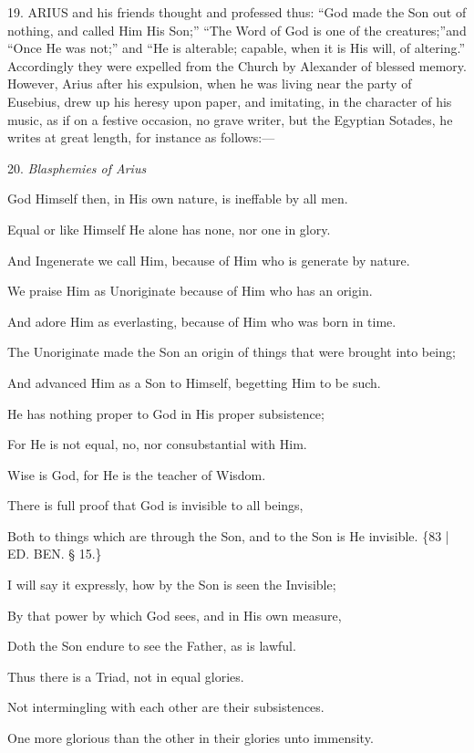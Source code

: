 
19. ARIUS
and his friends thought and professed thus: ``God made the Son out of
nothing, and called Him His Son;'' ``The Word of God is one of the
creatures;''\emph{}and ``Once He was not;'' and ``He is alterable;
capable, when it is His will, of altering.'' Accordingly they were
expelled from the Church by Alexander of blessed memory. However,
Arius after his expulsion, when he was living near the party of
Eusebius, drew up his heresy upon paper, and imitating, in the
character of his music, as if on a festive occasion, no grave writer,
but the Egyptian Sotades, he writes at great length, for instance as
follows:—

20. \emph{Blasphemies of Arius}

God Himself then, in His own
nature, is ineffable by all men.

Equal or like Himself He alone
has none, nor one in glory.

And Ingenerate we call Him,
because of Him who is generate by nature.

We praise Him as Unoriginate
because of Him who has an origin.

And adore Him as everlasting,
because of Him who was born in time.

The Unoriginate made the Son
an origin of things that were brought into being;

And advanced Him as a Son to
Himself, begetting Him to be such.

He has nothing proper to God
in His proper subsistence;

For He is not equal, no, nor
consubstantial with Him.

Wise is God, for He is the
teacher of Wisdom.

There is full proof that God
is invisible to all beings,

Both to things which are
through the Son, and to the Son is He invisible. \{83 | ED.
BEN.
§ 15.\}

I will say it expressly, how
by the Son is seen the Invisible;

By that power by which God
sees, and in His own measure,

Doth the Son endure to see the
Father, as is lawful.

Thus there is a Triad, not in
equal glories.

Not intermingling with each
other are their subsistences.

One more glorious than the
other in their glories unto immensity.

